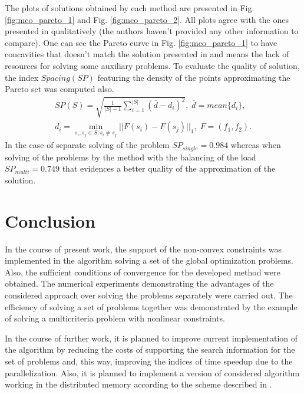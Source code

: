 \documentclass[runningheads]{llncs}
\begin{document}
The plots of solutions obtained by each method are presented in Fig. \ref{fig:mco_pareto_1}
and Fig. \ref{fig:mco_pareto_2}.
All plots agree with the ones presented in \cite{BinhKorn1999} qualitatively (the authors
haven't provided any other information to compare).
One can see the Pareto curve in Fig. \ref{fig:mco_pareto_1} to have concavities that doesn't
match the solution presented in \cite{BinhKorn1999} and means the lack of resources for
solving some auxiliary problems.
To evaluate the quality of solution, the index \(Spacing(SP)\) \cite{RiquelmeLucken2015}
featuring the density of the points approximating the Pareto set was computed also.
\begin{equation*}
\begin {array}{l}
  SP(S)=\sqrt{\frac{1}{|S|-1} \sum_{i=1}^{|S|} (\overline{d}-d_i)^2},
  \; \overline{d}=mean\{d_i\},
  \\d_i=\min_{s_i,s_j\in S:s_i\ne s_j}||F(s_i)-F(s_j)||_1,\; F=(f_1,f_2).
  \end{array}
\end{equation*}
In the case of separate solving of the problem \(SP_{single}=0.984\) whereas when solving of
the problems by the method with the balancing of the load \(SP_{multi}=0.749\) that evidences
a better quality of the approximation of the solution.

\section{Conclusion}

In the course of present work, the support of the non-convex constraints was implemented in the
algorithm solving a set of the global optimization problems.
Also, the sufficient conditions of convergence for the developed method were obtained.
The numerical experiments demonstrating the advantages of the considered approach over
solving the problems separately were carried out.
The efficiency of solving a set of problems together was demonstrated by the example of
solving a multicriteria problem with nonlinear constraints.

In the course of further work, it is planned to improve current implementation of the algorithm
by reducing the costs of supporting the search information for the set of problems and, this way,
improving the indices of time speedup due to the parallelization.
Also, it is planned to implement a version of considered algorithm working in the distributed
memory according to the scheme described in \cite{BarkalovLebedev2017_2}.

%
%
%


%
\end{document}
